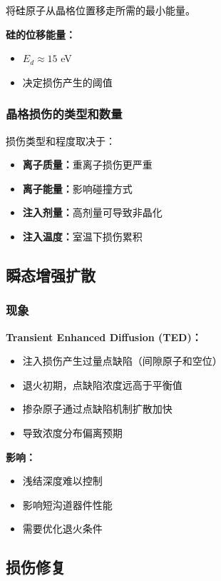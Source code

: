 \documentclass[UTF8,12pt,a4paper]{ctexart}
\begin{document}
将硅原子从晶格位置移走所需的最小能量。

\textbf{硅的位移能量：}
\begin{itemize}
    \item $E_d \approx 15$ eV
    \item 决定损伤产生的阈值
\end{itemize}

\subsubsection{晶格损伤的类型和数量}

损伤类型和程度取决于：
\begin{itemize}
    \item \textbf{离子质量：}重离子损伤更严重
    \item \textbf{离子能量：}影响碰撞方式
    \item \textbf{注入剂量：}高剂量可导致非晶化
    \item \textbf{注入温度：}室温下损伤累积
\end{itemize}

\subsection{瞬态增强扩散}

\subsubsection{现象}

\textbf{Transient Enhanced Diffusion (TED)：}

\begin{itemize}
    \item 注入损伤产生过量点缺陷（间隙原子和空位）
    \item 退火初期，点缺陷浓度远高于平衡值
    \item 掺杂原子通过点缺陷机制扩散加快
    \item 导致浓度分布偏离预期
\end{itemize}

\textbf{影响：}
\begin{itemize}
    \item 浅结深度难以控制
    \item 影响短沟道器件性能
    \item 需要优化退火条件
\end{itemize}

\subsection{损伤修复}
\end{document}
